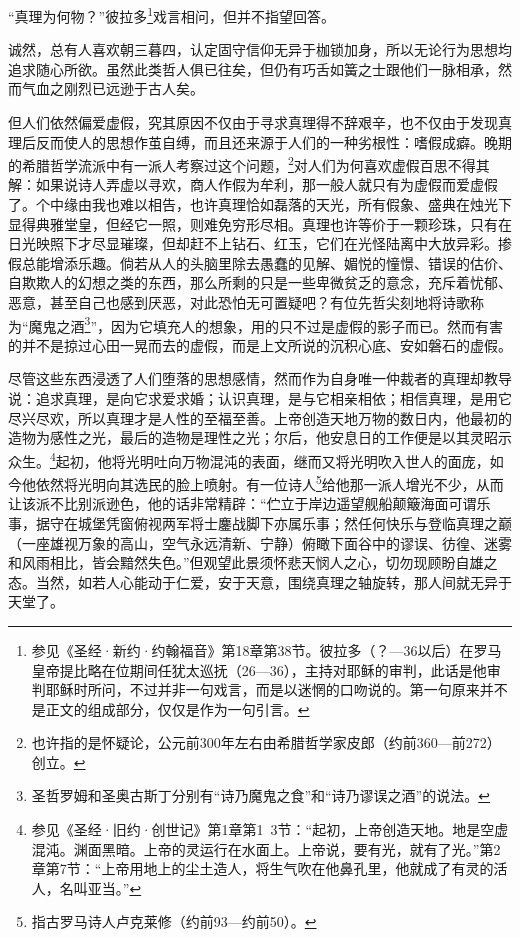 \par “真理为何物？”彼拉多\footnote{参见《圣经·新约·约翰福音》第18章第38节。彼拉多（？—36以后）在罗马皇帝提比略在位期间任犹太巡抚（26—36），主持对耶稣的审判，此话是他审判耶稣时所问，不过并非一句戏言，而是以迷惘的口吻说的。第一句原来并不是正文的组成部分，仅仅是作为一句引言。}戏言相问，但并不指望回答。
\par 诚然，总有人喜欢朝三暮四，认定固守信仰无异于枷锁加身，所以无论行为思想均追求随心所欲。虽然此类哲人俱已往矣，但仍有巧舌如簧之士跟他们一脉相承，然而气血之刚烈已远逊于古人矣。
\par 但人们依然偏爱虚假，究其原因不仅由于寻求真理得不辞艰辛，也不仅由于发现真理后反而使人的思想作茧自缚，而且还来源于人们的一种劣根性：嗜假成癖。晚期的希腊哲学流派中有一派人考察过这个问题，\footnote{也许指的是怀疑论，公元前300年左右由希腊哲学家皮郎（约前360—前272）创立。}对人们为何喜欢虚假百思不得其解：如果说诗人弄虚以寻欢，商人作假为牟利，那一般人就只有为虚假而爱虚假了。个中缘由我也难以相告，也许真理恰如磊落的天光，所有假象、盛典在烛光下显得典雅堂皇，但经它一照，则难免穷形尽相。真理也许等价于一颗珍珠，只有在日光映照下才尽显璀璨，但却赶不上钻石、红玉，它们在光怪陆离中大放异彩。掺假总能增添乐趣。倘若从人的头脑里除去愚蠢的见解、媚悦的憧憬、错误的估价、自欺欺人的幻想之类的东西，那么所剩的只是一些卑微贫乏的意念，充斥着忧郁、恶意，甚至自己也感到厌恶，对此恐怕无可置疑吧？有位先哲尖刻地将诗歌称为“魔鬼之酒\footnote{圣哲罗姆和圣奥古斯丁分别有“诗乃魔鬼之食”和“诗乃谬误之酒”的说法。}”，因为它填充人的想象，用的只不过是虚假的影子而已。然而有害的并不是掠过心田一晃而去的虚假，而是上文所说的沉积心底、安如磐石的虚假。
\par 尽管这些东西浸透了人们堕落的思想感情，然而作为自身唯一仲裁者的真理却教导说：追求真理，是向它求爱求婚；认识真理，是与它相亲相依；相信真理，是用它尽兴尽欢，所以真理才是人性的至福至善。上帝创造天地万物的数日内，他最初的造物为感性之光，最后的造物是理性之光；尔后，他安息日的工作便是以其灵昭示众生。\footnote{参见《圣经·旧约·创世记》第1章第1~3节：“起初，上帝创造天地。地是空虚混沌。渊面黑暗。上帝的灵运行在水面上。上帝说，要有光，就有了光。”第2章第7节：“上帝用地上的尘土造人，将生气吹在他鼻孔里，他就成了有灵的活人，名叫亚当。”}起初，他将光明吐向万物混沌的表面，继而又将光明吹入世人的面庞，如今他依然将光明向其选民的脸上喷射。有一位诗人\footnote{指古罗马诗人卢克莱修（约前93—约前50）。}给他那一派人增光不少，从而让该派不比别派逊色，他的话非常精辟：“伫立于岸边遥望舰船颠簸海面可谓乐事，据守在城堡凭窗俯视两军将士鏖战脚下亦属乐事；然任何快乐与登临真理之巅（一座雄视万象的高山，空气永远清新、宁静）俯瞰下面谷中的谬误、彷徨、迷雾和风雨相比，皆会黯然失色。”但观望此景须怀悲天悯人之心，切勿现顾盼自雄之态。当然，如若人心能动于仁爱，安于天意，围绕真理之轴旋转，那人间就无异于天堂了。
